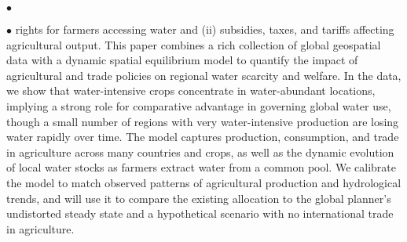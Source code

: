 \documentclass[margin,line]{res}
\newenvironment{list0}{
  \begin{list}{$\bullet$}{%
      \setlength{\itemsep}{0in}
      \setlength{\parsep}{0in} \setlength{\parskip}{0in}
      \setlength{\topsep}{0in} \setlength{\partopsep}{0in}
      \setlength{\leftmargin}{0.0in}}}{\end{list}}
\newenvironment{list1}{
  \begin{list}{$\bullet$}{%
      \setlength{\itemsep}{0in}
      \setlength{\parsep}{0in} \setlength{\parskip}{0in}
      \setlength{\topsep}{0in} \setlength{\partopsep}{0in}
      \setlength{\leftmargin}{0.17in}}}{\end{list}}
\begin{document}
\begin{resume}
\begin{list0}
\begin{list1}
        rights for farmers accessing water and (ii) subsidies, taxes, and
        tariffs affecting agricultural output. This paper combines a rich
        collection of global geospatial data with a dynamic spatial equilibrium
        model to quantify the impact of agricultural and trade policies on
        regional water scarcity and welfare. In the data, we show that
        water-intensive crops concentrate in water-abundant locations,
        implying a strong role for comparative advantage in governing global
        water use, though a small number of regions with very water-intensive
        production are losing water rapidly over time. The model captures
        production, consumption, and trade in agriculture across many countries
        and crops, as well as the dynamic evolution of local water stocks as
        farmers extract water from a common pool. We calibrate the model to
        match observed patterns of agricultural production and hydrological
        trends, and will use it to compare the existing allocation to the global
        planner's undistorted steady state and a hypothetical scenario with no
        international trade in agriculture.
    \end{list1}
\end{list0}



\end{resume}
\end{document}
